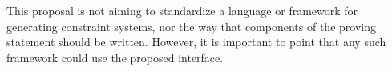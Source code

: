 \documentclass[a4paper,11pt]{article}
\begin{document}
This proposal is not aiming to standardize a language or framework for generating constraint systems, nor the way that components of the proving statement should be written. However, it is important to point that any such framework could use the proposed interface.







	
\end{document}
